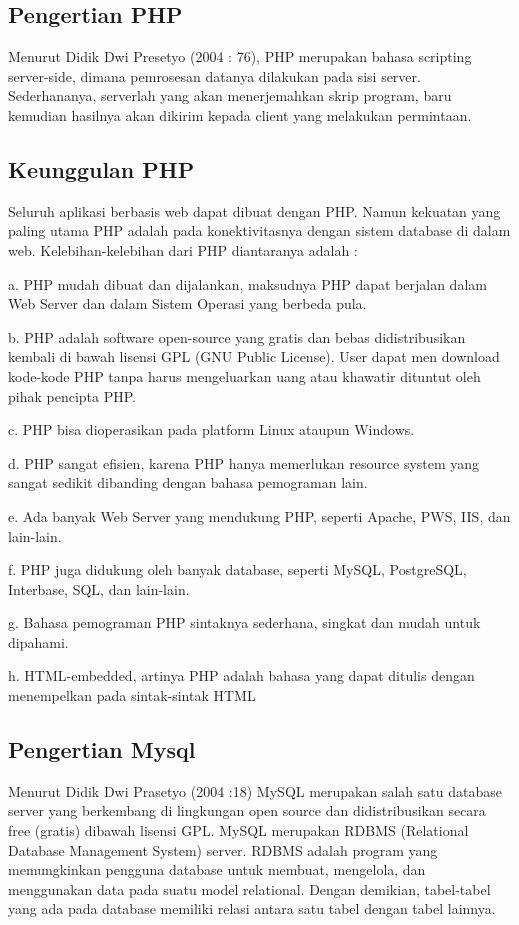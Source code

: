 \documentclass{jtetiproposalskripsi}
\begin{document}
\subsection{Pengertian PHP}
Menurut Didik Dwi Presetyo (2004 : 76), PHP merupakan bahasa 
scripting server-side, dimana pemrosesan datanya dilakukan pada sisi server. 
Sederhananya, serverlah yang akan menerjemahkan skrip program, baru 
kemudian hasilnya akan dikirim kepada client yang melakukan permintaan.

\subsection{Keunggulan PHP}
Seluruh aplikasi berbasis web dapat dibuat dengan PHP. Namun 
kekuatan yang paling utama PHP adalah pada konektivitasnya dengan sistem 
database di dalam web. Kelebihan-kelebihan dari PHP diantaranya adalah : 

a. PHP mudah dibuat dan dijalankan, maksudnya PHP dapat berjalan 
    dalam Web Server dan dalam Sistem Operasi yang berbeda pula. 

b. PHP adalah software open-source yang gratis dan bebas didistribusikan 
    kembali di bawah lisensi GPL (GNU Public License). User dapat men
   download kode-kode PHP tanpa harus mengeluarkan uang atau khawatir 
   dituntut oleh pihak pencipta PHP. 

c. PHP bisa dioperasikan pada platform Linux ataupun Windows. 

d. PHP sangat efisien, karena PHP hanya memerlukan resource system 
    yang sangat sedikit dibanding dengan bahasa pemograman lain. 

e. Ada banyak Web Server yang mendukung PHP, seperti Apache, PWS, 
    IIS, dan lain-lain. 

f. PHP juga didukung oleh banyak database, seperti MySQL, PostgreSQL, 
   Interbase, SQL, dan lain-lain. 

g. Bahasa pemograman PHP sintaknya sederhana, singkat dan mudah 
    untuk dipahami. 

h. HTML-embedded, artinya PHP adalah bahasa yang dapat ditulis dengan 
menempelkan pada sintak-sintak HTML

\subsection{Pengertian Mysql}
Menurut Didik Dwi Prasetyo (2004 :18) MySQL merupakan salah satu 
database server yang berkembang di lingkungan open source dan didistribusikan 
secara free (gratis) dibawah lisensi GPL. 
MySQL merupakan RDBMS (Relational Database Management 
System) server. RDBMS adalah program yang memungkinkan pengguna database 
untuk membuat, mengelola, dan menggunakan data pada suatu model relational. 
Dengan demikian, tabel-tabel yang ada pada database memiliki relasi antara satu 
tabel dengan tabel lainnya.
\end{document}
